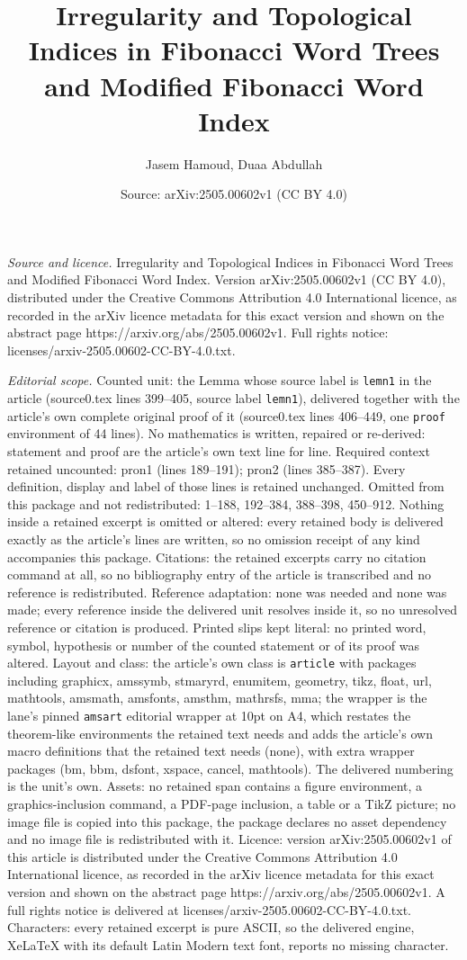 \documentclass[10pt,a4paper]{amsart}
\title[Irregularity and Topological Indices in Fibonacci Word Trees]{Irregularity and Topological Indices in Fibonacci Word Trees and Modified Fibonacci Word Index}
\author{Jasem Hamoud, Duaa Abdullah}
\date{Source: arXiv:2505.00602v1 (CC BY 4.0)}
\begin{document}
\maketitle

\noindent\emph{Source and licence.} Irregularity and Topological Indices in Fibonacci Word Trees and Modified Fibonacci Word Index. Version arXiv:2505.00602v1 (CC BY 4.0), distributed under the Creative Commons Attribution 4.0 International licence, as recorded in the arXiv licence metadata for this exact version and shown on the abstract page https://arxiv.org/abs/2505.00602v1. Full rights notice: licenses/arxiv-2505.00602-CC-BY-4.0.txt.\par\smallskip

\noindent\textit{Editorial scope.} Counted unit: the Lemma whose source label is \texttt{lemn1} in the article (source0.tex lines 399--405, source label \texttt{lemn1}), delivered together with the article's own complete original proof of it (source0.tex lines 406--449, one \texttt{proof} environment of 44 lines). No mathematics is written, repaired or re-derived: statement and proof are the article's own text line for line. Required context retained uncounted: pron1 (lines 189--191); pron2 (lines 385--387). Every definition, display and label of those lines is retained unchanged. Omitted from this package and not redistributed: 1--188, 192--384, 388--398, 450--912. Nothing inside a retained excerpt is omitted or altered: every retained body is delivered exactly as the article's lines are written, so no omission receipt of any kind accompanies this package. Citations: the retained excerpts carry no citation command at all, so no bibliography entry of the article is transcribed and no reference is redistributed. Reference adaptation: none was needed and none was made; every reference inside the delivered unit resolves inside it, so no unresolved reference or citation is produced. Printed slips kept literal: no printed word, symbol, hypothesis or number of the counted statement or of its proof was altered. Layout and class: the article's own class is \texttt{article} with packages including graphicx, amssymb, stmaryrd, enumitem, geometry, tikz, float, url, mathtools, amsmath, amsfonts, amsthm, mathrsfs, mma; the wrapper is the lane's pinned \texttt{amsart} editorial wrapper at 10pt on A4, which restates the theorem-like environments the retained text needs and adds the article's own macro definitions that the retained text needs (none), with extra wrapper packages (bm, bbm, dsfont, xspace, cancel, mathtools). The delivered numbering is the unit's own. Assets: no retained span contains a figure environment, a graphics-inclusion command, a PDF-page inclusion, a table or a TikZ picture; no image file is copied into this package, the package declares no asset dependency and no image file is redistributed with it. Licence: version arXiv:2505.00602v1 of this article is distributed under the Creative Commons Attribution 4.0 International licence, as recorded in the arXiv licence metadata for this exact version and shown on the abstract page https://arxiv.org/abs/2505.00602v1. A full rights notice is delivered at licenses/arxiv-2505.00602-CC-BY-4.0.txt. Characters: every retained excerpt is pure ASCII, so the delivered engine, XeLaTeX with its default Latin Modern text font, reports no missing character.
\end{document}
